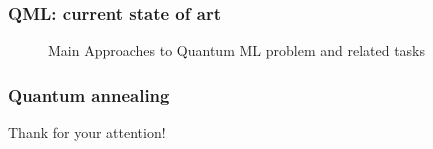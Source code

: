 \documentclass{beamer}
\begin{document}
\begin{frame}
\frametitle{QML: current state of art}
\begin{figure}
\caption{Main Approaches to Quantum ML problem and related tasks\footnotemark[1]}
\end{figure}

\end{frame}

\begin{frame}
\frametitle{Quantum annealing}
\end{frame}


\begin{frame}
\begin{center}
Thank for your attention!
\end{center}
\end{frame}
\end{document}
